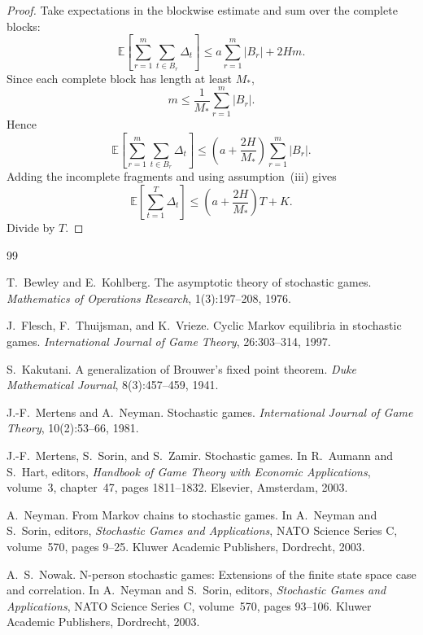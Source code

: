 \documentclass[12pt]{article}
\theoremstyle{definition}
\newcommand{\E}{\mathbb{E}}
\newcommand{\1}{\mathbf{1}}
\begin{document}
\begin{proof}
Take expectations in the blockwise estimate and sum over the complete blocks:
\[
\E\left[\sum_{r=1}^m\sum_{t\in B_r}\Delta_t\right]
\le a\sum_{r=1}^m|B_r| + 2Hm.
\]
Since each complete block has length at least $M_*$,
\[
m\le \frac{1}{M_*}\sum_{r=1}^m |B_r|.
\]
Hence
\[
\E\left[\sum_{r=1}^m\sum_{t\in B_r}\Delta_t\right]
\le
\left(a+\frac{2H}{M_*}\right)\sum_{r=1}^m|B_r|.
\]
Adding the incomplete fragments and using assumption~(iii) gives
\[
\E\left[\sum_{t=1}^T\Delta_t\right]
\le
\left(a+\frac{2H}{M_*}\right)T + K.
\]
Divide by $T$.
\end{proof}

\begin{thebibliography}{99}

T.~Bewley and E.~Kohlberg.
\newblock The asymptotic theory of stochastic games.
\newblock \emph{Mathematics of Operations Research}, 1(3):197--208, 1976.

J.~Flesch, F.~Thuijsman, and K.~Vrieze.
\newblock Cyclic {M}arkov equilibria in stochastic games.
\newblock \emph{International Journal of Game Theory}, 26:303--314, 1997.

S.~Kakutani.
\newblock A generalization of {B}rouwer's fixed point theorem.
\newblock \emph{Duke Mathematical Journal}, 8(3):457--459, 1941.

J.-F.~Mertens and A.~Neyman.
\newblock Stochastic games.
\newblock \emph{International Journal of Game Theory}, 10(2):53--66, 1981.

J.-F.~Mertens, S.~Sorin, and S.~Zamir.
\newblock Stochastic games.
\newblock In R.~Aumann and S.~Hart, editors, \emph{Handbook of Game Theory with
Economic Applications}, volume~3, chapter~47, pages 1811--1832. Elsevier,
Amsterdam, 2003.

A.~Neyman.
\newblock From {M}arkov chains to stochastic games.
\newblock In A.~Neyman and S.~Sorin, editors, \emph{Stochastic Games and
Applications}, NATO Science Series C, volume~570, pages 9--25. Kluwer Academic
Publishers, Dordrecht, 2003.

A.~S.~Nowak.
\newblock N-person stochastic games: Extensions of the finite state space case and
correlation.
\newblock In A.~Neyman and S.~Sorin, editors, \emph{Stochastic Games and
Applications}, NATO Science Series C, volume~570, pages 93--106. Kluwer Academic
Publishers, Dordrecht, 2003.


\end{thebibliography}
\end{document}
